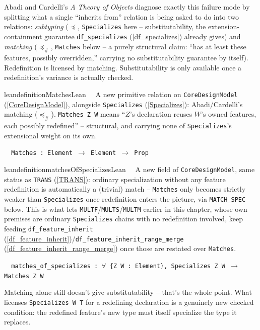 \pn Abadi and Cardelli's \emph{A Theory of Objects} diagnose exactly this failure mode by splitting
what a single ``inherits from'' relation is being asked to do into two relations: \emph{subtyping}
($\preceq$, \texttt{Specializes} here -- substitutability, the extension-containment guarantee
\texttt{df\_specializes} (\ref{df_specializes}) already gives) and \emph{matching} ($\preceq_\#$,
\texttt{Matches} below -- a purely structural claim: ``has at least these features, possibly
overridden,'' carrying no substitutability guarantee by itself). Redefinition is licensed by matching.
Substitutability is only available once a redefinition's variance is actually checked.

\begin{restatable}{leandefinition}{MatchesLean}~~ A new primitive relation on
\texttt{CoreDesignModel} (\ref{CoreDesignModel}), alongside \texttt{Specializes}
(\ref{Specializes}): Abadi/Cardelli's matching ($\preceq_\#$). \texttt{Matches Z W} means ``$Z$'s
declaration reuses $W$'s owned features, each possibly redefined'' -- structural, and carrying none
of \texttt{Specializes}'s extensional weight on its own.

\texttt{~~Matches : Element $\to$ Element $\to$ Prop}
\label{Matches}
\end{restatable}

\begin{restatable}{leandefinition}{matchesOfSpecializesLean}~~ A
new field of \texttt{CoreDesignModel}, same status as \texttt{TRANS} (\ref{TRANS}): ordinary
specialization without any feature redefinition is automatically a (trivial) match --
\texttt{Matches} only becomes strictly weaker than \texttt{Specializes} once redefinition enters the
picture, via \texttt{MATCH\_SPEC} below. This is what lets \texttt{MULTF}/\texttt{MULTS}/\texttt{MULTM}
earlier in this chapter, whose own premises are ordinary \texttt{Specializes}
chains with no redefinition involved, keep feeding \texttt{df\_feature\_inherit}
(\ref{df_feature_inherit})/\texttt{df\_feature\_inherit\_range\_merge}
(\ref{df_feature_inherit_range_merge}) once those are restated over \texttt{Matches}.

\texttt{~~matches\_of\_specializes : $\forall$ \{Z W : Element\}, Specializes Z W $\to$ Matches Z W}
\label{matches_of_specializes}
\end{restatable}

\pn Matching alone still doesn't give substitutability -- that's the whole point. What licenses
\texttt{Specializes W T} for a redefining declaration is a genuinely new checked condition: the
redefined feature's new type must itself specialize the type it replaces.

